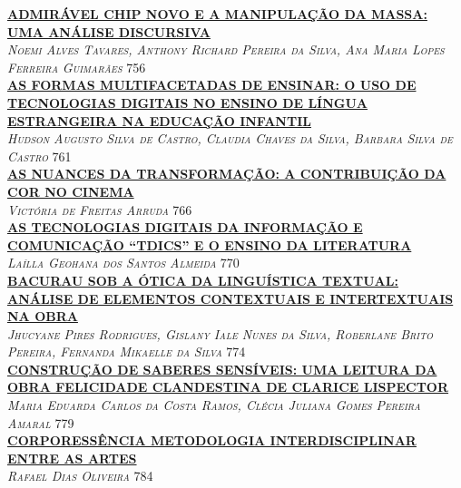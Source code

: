 \noindent \textsc{\hyperlink{trabalhos/249916.pdf.1}{\textbf{ADMIRÁVEL CHIP NOVO E A MANIPULAÇÃO DA MASSA: UMA ANÁLISE DISCURSIVA}}}\\ 
\noindent \textsc{\textit{Noemi Alves Tavares, Anthony Richard Pereira da Silva, Ana Maria Lopes Ferreira Guimarães}} \hfill 756\\ 

\noindent \textsc{\hyperlink{trabalhos/251568.pdf.1}{\textbf{AS FORMAS MULTIFACETADAS DE ENSINAR: O USO DE TECNOLOGIAS DIGITAIS NO ENSINO DE LÍNGUA ESTRANGEIRA NA EDUCAÇÃO INFANTIL}}}\\ 
\noindent \textsc{\textit{Hudson Augusto Silva de Castro, Claudia Chaves da Silva, Barbara Silva de Castro}} \hfill 761\\ 

\noindent \textsc{\hyperlink{trabalhos/251664.pdf.1}{\textbf{AS NUANCES DA TRANSFORMAÇÃO: A CONTRIBUIÇÃO DA COR NO CINEMA }}}\\ 
\noindent \textsc{\textit{Victória de Freitas Arruda}} \hfill 766\\ 

\noindent \textsc{\hyperlink{trabalhos/251489.pdf.1}{\textbf{AS TECNOLOGIAS DIGITAIS DA INFORMAÇÃO E COMUNICAÇÃO “TDICS” E O ENSINO DA LITERATURA}}}\\ 
\noindent \textsc{\textit{Laílla Geohana dos Santos Almeida}} \hfill 770\\ 

\noindent \textsc{\hyperlink{trabalhos/249212.pdf.1}{\textbf{BACURAU SOB A ÓTICA DA LINGUÍSTICA TEXTUAL: ANÁLISE DE ELEMENTOS CONTEXTUAIS E INTERTEXTUAIS NA OBRA }}}\\ 
\noindent \textsc{\textit{Jhucyane Pires Rodrigues, Gislany Iale Nunes da Silva, Roberlane Brito Pereira, Fernanda Mikaelle da Silva}} \hfill 774\\ 

\noindent \textsc{\hyperlink{trabalhos/250047.pdf.1}{\textbf{CONSTRUÇÃO DE SABERES SENSÍVEIS: UMA LEITURA DA OBRA FELICIDADE CLANDESTINA DE CLARICE LISPECTOR}}}\\ 
\noindent \textsc{\textit{Maria Eduarda Carlos da Costa Ramos, Clécia Juliana Gomes Pereira Amaral}} \hfill 779\\ 

\noindent \textsc{\hyperlink{trabalhos/250512.pdf.1}{\textbf{CORPORESSÊNCIA METODOLOGIA INTERDISCIPLINAR ENTRE AS ARTES}}}\\ 
\noindent \textsc{\textit{Rafael Dias Oliveira}} \hfill 784\\ 

